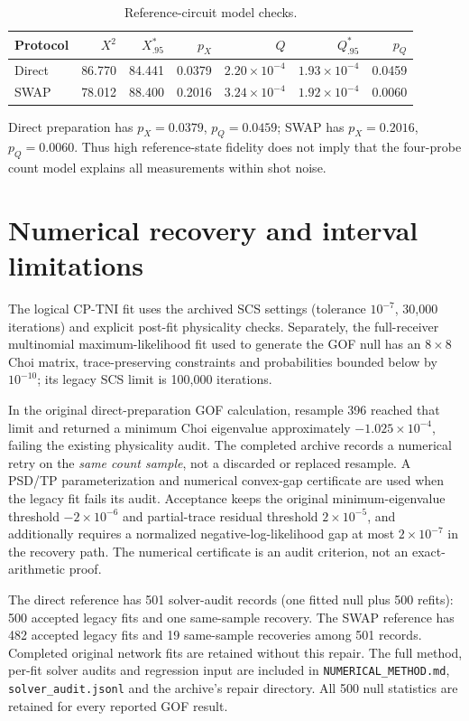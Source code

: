 \documentclass[10pt,a4paper]{article}
\begin{document}
\par\begin{table}[htbp]\centering\footnotesize
\caption{Reference-circuit model checks.}\label{stab:gof_refs}
\begin{tabular}{lrrrrrr}\toprule
Protocol & $X^2$ & $X^*_{.95}$ & $p_X$ & $Q$ & $Q^*_{.95}$ & $p_Q$\\\midrule
Direct & 86.770 & 84.441 & 0.0379 & $2.20\times10^{-4}$ & $1.93\times10^{-4}$ & 0.0459 \\
SWAP & 78.012 & 88.400 & 0.2016 & $3.24\times10^{-4}$ & $1.92\times10^{-4}$ & 0.0060 \\
\bottomrule\end{tabular}\end{table}\par
Direct preparation has $p_X=0.0379$, $p_Q=0.0459$; SWAP has $p_X=0.2016$, $p_Q=0.0060$. Thus high reference-state fidelity does not imply that the four-probe count model explains all measurements within shot noise.\clearpage
\section{Numerical recovery and interval limitations}
The logical CP-TNI fit uses the archived SCS settings (tolerance $10^{-7}$, 30,000 iterations) and explicit post-fit physicality checks. Separately, the full-receiver multinomial maximum-likelihood fit used to generate the GOF null has an $8\times8$ Choi matrix, trace-preserving constraints and probabilities bounded below by $10^{-10}$; its legacy SCS limit is 100,000 iterations.

In the original direct-preparation GOF calculation, resample 396 reached that limit and returned a minimum Choi eigenvalue approximately $-1.025\times10^{-4}$, failing the existing physicality audit. The completed archive records a numerical retry on the \emph{same count sample}, not a discarded or replaced resample. A PSD/TP parameterization and numerical convex-gap certificate are used when the legacy fit fails its audit. Acceptance keeps the original minimum-eigenvalue threshold $-2\times10^{-6}$ and partial-trace residual threshold $2\times10^{-5}$, and additionally requires a normalized negative-log-likelihood gap at most $2\times10^{-7}$ in the recovery path. The numerical certificate is an audit criterion, not an exact-arithmetic proof.

The direct reference has 501 solver-audit records (one fitted null plus 500 refits): 500 accepted legacy fits and one same-sample recovery. The SWAP reference has 482 accepted legacy fits and 19 same-sample recoveries among 501 records. Completed original network fits are retained without this repair. The full method, per-fit solver audits and regression input are included in \nolinkurl{NUMERICAL_METHOD.md}, \nolinkurl{solver_audit.jsonl} and the archive's repair directory. All 500 null statistics are retained for every reported GOF result.
\end{document}
